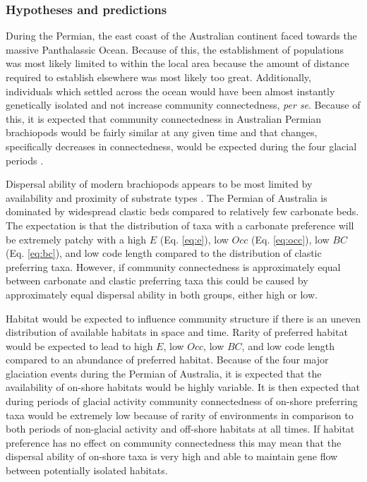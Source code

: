 \documentclass[12pt,letterpaper]{article}
\begin{document}
\subsubsection{Hypotheses and predictions} \label{sec:braccompred}
During the Permian, the east coast of the Australian continent faced towards the massive Panthalassic Ocean. Because of this, the establishment of populations was most likely limited to within the local area because the amount of distance required to establish elsewhere was most likely too great. Additionally, individuals which settled across the ocean would have been almost instantly genetically isolated and not increase community connectedness, \textit{per se}. Because of this, it is expected that community connectedness in Australian Permian brachiopods would be fairly similar at any given time and that changes, specifically decreases in connectedness, would be expected during the four glacial periods \citep{Fielding2008a,Fielding2008}.

Dispersal ability of modern brachiopods appears to be most limited by availability and proximity of substrate types \citep{Richardson1997,Richardson1997a}. The Permian of Australia is dominated by widespread clastic beds compared to relatively few carbonate beds. The expectation is that the distribution of taxa with a carbonate preference will be extremely patchy with a high \(E\) (Eq. \ref{eq:e}), low \(Occ\) (Eq. \ref{eq:occ}), low \(BC\) (Eq. \ref{eq:bc}), and low code length \citep{Rosvall2008,Sidor2013} compared to the distribution of clastic preferring taxa. However, if community connectedness is approximately equal between carbonate and clastic preferring taxa this could be caused by approximately equal dispersal ability in both groups, either high or low.

Habitat would be expected to influence community structure if there is an uneven distribution of available habitats in space and time. Rarity of preferred habitat would be expected to lead to high \(E\), low \(Occ\), low \(BC\), and low code length compared to an abundance of preferred habitat. Because of the four major glaciation events during the Permian of Australia, it is expected that the availability of on-shore habitats would be highly variable. It is then expected that during periods of glacial activity community connectedness of on-shore preferring taxa would be extremely low because of rarity of environments in comparison to both periods of non-glacial activity and off-shore habitats at all times. If habitat preference has no effect on community connectedness this may mean that the dispersal ability of on-shore taxa is very high and able to maintain gene flow between potentially isolated habitats.
\end{document}
